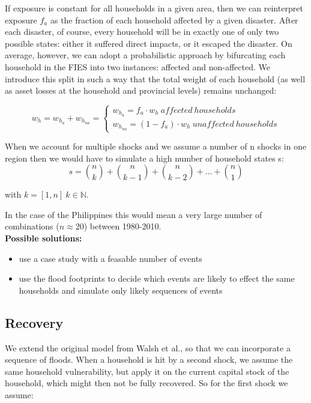 \documentclass{article}
\begin{document}
If exposure is constant for all households in a given area, then we can reinterpret exposure $f_a$
as the fraction of each household affected by a given disaster. After each disaster, of
course, every household will be in exactly one of only two possible states: either it
suffered direct impacts, or it escaped the disaster. On average, however, we can adopt
a probabilistic approach by bifurcating each household in the FIES into two instances:
affected and non-affected. We introduce this split in such a way that the total weight
of each household (as well as asset losses at the household and provincial levels)
remains unchanged:

\begin{equation}
w_h = w_{h_{a}} + w_{h_{na}}=
\begin{cases}
w_{h_{a}} = f_a \cdot w_h \ affected \ households\\
w_{h_{na}} =( 1-f_a) \cdot w_h \ unaffected \ households
\end{cases}
\end{equation}

When we account for multiple shocks and we assume a number of n shocks in one region then we would have to simulate a high number of household states s:
\begin{equation}
s = \binom{n}{k} + \binom{n}{k-1} + \binom{n}{k-2}+ ... + \binom{n}{1}
\end{equation}

with $k = [1,n]  \ k \in \mathbb{N}$.

In the case of the Philippines this would mean  a very large number of combinations ($n \approx 20$) between 1980-2010.\\


\textbf{Possible solutions:}
\begin{itemize}
	\item use a case study with a feasable number of events 
	\item use the flood footprints to decide which events are likely to effect the same households and simulate only likely sequences of events
	
\end{itemize}


\subsection{Recovery}
We extend the original model from Walsh et al., so that we can incorporate a sequence of floods. When a household is hit by a second shock, we assume the same household vulnerability, but apply it on the current capital stock of the household, which might then not be fully recovered.
So for the first shock we assume:
\end{document}
